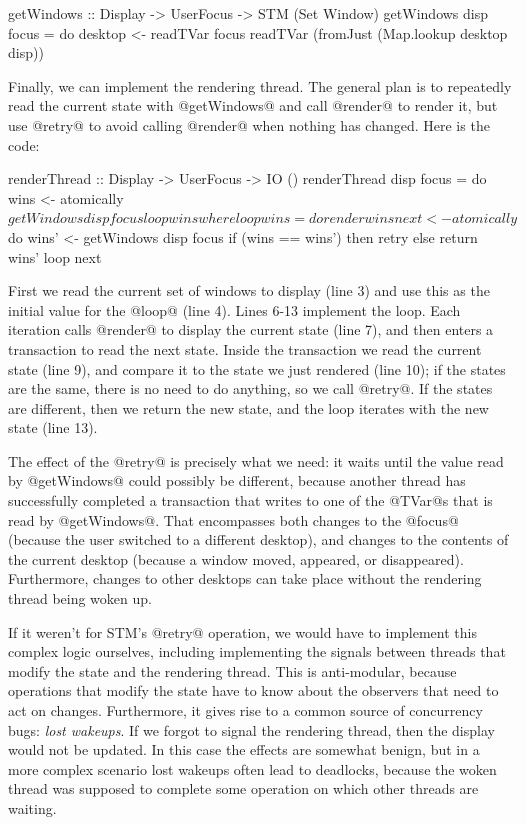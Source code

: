 \begin{haskell}
getWindows :: Display -> UserFocus -> STM (Set Window)
getWindows disp focus = do
  desktop <- readTVar focus
  readTVar (fromJust (Map.lookup desktop disp))
\end{haskell}

Finally, we can implement the rendering thread.  The general plan is
to repeatedly read the current state with @getWindows@ and call
@render@ to render it, but use @retry@ to avoid calling @render@ when
nothing has changed.  Here is the code:

\begin{numhaskell}
renderThread :: Display -> UserFocus -> IO ()
renderThread disp focus = do
  wins <- atomically $ getWindows disp focus
  loop wins
 where
  loop wins = do
    render wins
    next <- atomically $ do
               wins' <- getWindows disp focus
               if (wins == wins')
                   then retry
                   else return wins'
    loop next
\end{numhaskell}

\noindent First we read the current set of windows to display (line 3)
and use this as the initial value for the @loop@ (line 4).  Lines 6-13
implement the loop.  Each iteration calls @render@ to display the
current state (line 7), and then enters a transaction to read the next
state.  Inside the transaction we read the current state (line 9), and
compare it to the state we just rendered (line 10); if the states are
the same, there is no need to do anything, so we call @retry@.  If the
states are different, then we return the new state, and the loop
iterates with the new state (line 13).

The effect of the @retry@ is precisely what we need: it waits until
the value read by @getWindows@ could possibly be different, because
another thread has successfully completed a transaction that writes to
one of the @TVar@s that is read by @getWindows@.  That encompasses
both changes to the @focus@ (because the user switched to a different
desktop), and changes to the contents of the current desktop (because
a window moved, appeared, or disappeared).  Furthermore, changes to
other desktops can take place without the rendering thread being woken
up.

If it weren't for STM's @retry@ operation, we would have to implement
this complex logic ourselves, including implementing the signals
between threads that modify the state and the rendering thread.  This
is anti-modular, because operations that modify the state have to know
about the observers that need to act on changes.  Furthermore, it
gives rise to a common source of concurrency bugs: \emph{lost
  wakeups}.  If we forgot to signal the rendering thread, then the
display would not be updated.  In this case the effects are somewhat
benign, but in a more complex scenario lost wakeups often lead to
deadlocks, because the woken thread was supposed to complete some
operation on which other threads are waiting.

